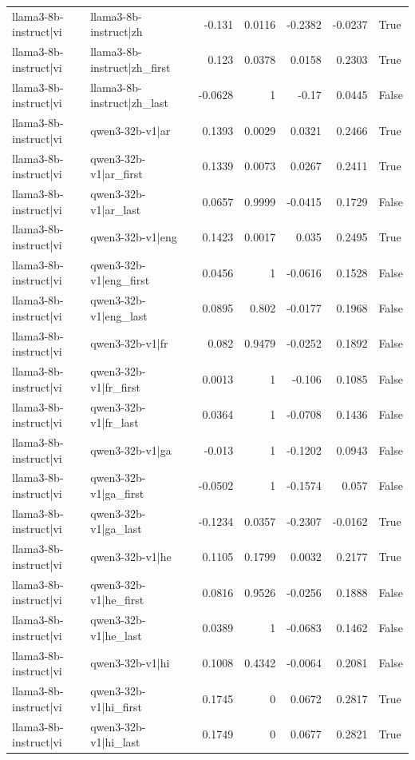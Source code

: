 \begin{table}
\begin{tabular}{l l r r r r l}
llama3-8b-instruct|vi & llama3-8b-instruct|zh & -0.131 & 0.0116 & -0.2382 & -0.0237 & True \\
llama3-8b-instruct|vi & llama3-8b-instruct|zh_first & 0.123 & 0.0378 & 0.0158 & 0.2303 & True \\
llama3-8b-instruct|vi & llama3-8b-instruct|zh_last & -0.0628 & 1 & -0.17 & 0.0445 & False \\
llama3-8b-instruct|vi & qwen3-32b-v1|ar & 0.1393 & 0.0029 & 0.0321 & 0.2466 & True \\
llama3-8b-instruct|vi & qwen3-32b-v1|ar_first & 0.1339 & 0.0073 & 0.0267 & 0.2411 & True \\
llama3-8b-instruct|vi & qwen3-32b-v1|ar_last & 0.0657 & 0.9999 & -0.0415 & 0.1729 & False \\
llama3-8b-instruct|vi & qwen3-32b-v1|eng & 0.1423 & 0.0017 & 0.035 & 0.2495 & True \\
llama3-8b-instruct|vi & qwen3-32b-v1|eng_first & 0.0456 & 1 & -0.0616 & 0.1528 & False \\
llama3-8b-instruct|vi & qwen3-32b-v1|eng_last & 0.0895 & 0.802 & -0.0177 & 0.1968 & False \\
llama3-8b-instruct|vi & qwen3-32b-v1|fr & 0.082 & 0.9479 & -0.0252 & 0.1892 & False \\
llama3-8b-instruct|vi & qwen3-32b-v1|fr_first & 0.0013 & 1 & -0.106 & 0.1085 & False \\
llama3-8b-instruct|vi & qwen3-32b-v1|fr_last & 0.0364 & 1 & -0.0708 & 0.1436 & False \\
llama3-8b-instruct|vi & qwen3-32b-v1|ga & -0.013 & 1 & -0.1202 & 0.0943 & False \\
llama3-8b-instruct|vi & qwen3-32b-v1|ga_first & -0.0502 & 1 & -0.1574 & 0.057 & False \\
llama3-8b-instruct|vi & qwen3-32b-v1|ga_last & -0.1234 & 0.0357 & -0.2307 & -0.0162 & True \\
llama3-8b-instruct|vi & qwen3-32b-v1|he & 0.1105 & 0.1799 & 0.0032 & 0.2177 & True \\
llama3-8b-instruct|vi & qwen3-32b-v1|he_first & 0.0816 & 0.9526 & -0.0256 & 0.1888 & False \\
llama3-8b-instruct|vi & qwen3-32b-v1|he_last & 0.0389 & 1 & -0.0683 & 0.1462 & False \\
llama3-8b-instruct|vi & qwen3-32b-v1|hi & 0.1008 & 0.4342 & -0.0064 & 0.2081 & False \\
llama3-8b-instruct|vi & qwen3-32b-v1|hi_first & 0.1745 & 0 & 0.0672 & 0.2817 & True \\
llama3-8b-instruct|vi & qwen3-32b-v1|hi_last & 0.1749 & 0 & 0.0677 & 0.2821 & True \\

\end{tabular}
\end{table}
